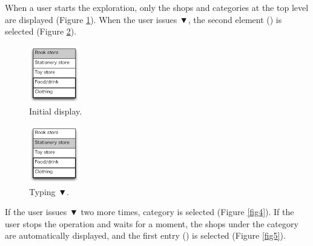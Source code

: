 \documentclass{article}
\def\down{▼}
\begin{document}
When a user starts the exploration, only the shops and categories
at the top level are displayed (Figure \ref{fig2}).
When the user issues {\down},
the second element () is selected (Figure \ref{fig3}).

\def\menuwidth{22mm}

\begin{figure}[H]
\centerline{\includegraphics[width=\menuwidth, bb=0 0 139 157]{figures/fig2.pdf}}
\caption{Initial display.}
\label{fig2}
\end{figure}

\begin{figure}[H]
\centerline{\includegraphics[width=\menuwidth,bb=0 0 139 157]{figures/fig3.pdf}}
\caption{Typing {\down}.}
\label{fig3}
\end{figure}

If the user issues {\down} two more times, 
 category is selected (Figure \ref{fig4}).
If the user stops the operation and waits for a moment, the shops under the 
category are automatically displayed,
and the first entry () is selected (Figure \ref{fig5}).
\end{document}
